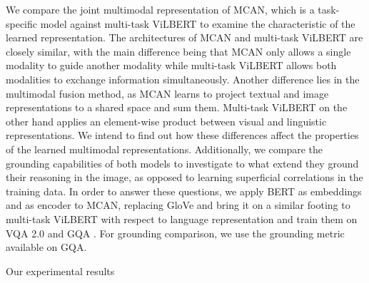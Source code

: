 \documentclass{article}
\newcommand{\todo}[1]{\textbf{\textcolor{Red}{(TODO: #1)}}}
\begin{document}
We compare the joint multimodal representation of MCAN, which is a task-specific model against multi-task ViLBERT to examine the characteristic of the learned representation. The architectures of MCAN and multi-task ViLBERT are closely similar, with the main difference being that MCAN only allows a single modality to guide another modality while multi-task ViLBERT allows both modalities to exchange information simultaneously. Another difference lies in the multimodal fusion method, as MCAN learns to project textual and image representations to a shared space and sum them. Multi-task ViLBERT on the other hand applies an element-wise product between visual and linguistic representations. We intend to find out how these differences affect the properties of the learned multimodal representations. Additionally, we compare the grounding capabilities of both models to investigate to what extend they ground their reasoning in the image, as opposed to learning superficial correlations in the training data. In order to answer these questions, we apply BERT as embeddings and as encoder to MCAN, replacing GloVe \citep{pennington2014glove} and bring it on a similar footing to multi-task ViLBERT with respect to language representation and train them on VQA 2.0 \citep{goyal2017vqa2} and GQA \cite{hudson2019gqa}. For grounding comparison, we use the grounding metric available on GQA.

Our experimental results





\end{document}
